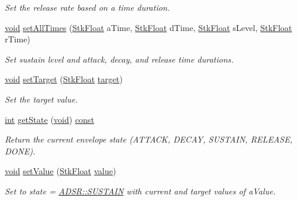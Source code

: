 \begin{DoxyCompactItemize}
\begin{DoxyCompactList}\small\item\em Set the release rate based on a time duration. \end{DoxyCompactList}\item 
\hyperlink{sound_8c_ae35f5844602719cf66324f4de2a658b3}{void} \hyperlink{class_nyq_1_1_a_d_s_r_a52e618060c63d77ff3a88fb04f271476}{set\+All\+Times} (\hyperlink{namespace_nyq_a044fa20a706520a617bbbf458a7db7e4}{Stk\+Float} a\+Time, \hyperlink{namespace_nyq_a044fa20a706520a617bbbf458a7db7e4}{Stk\+Float} d\+Time, \hyperlink{namespace_nyq_a044fa20a706520a617bbbf458a7db7e4}{Stk\+Float} s\+Level, \hyperlink{namespace_nyq_a044fa20a706520a617bbbf458a7db7e4}{Stk\+Float} r\+Time)
\begin{DoxyCompactList}\small\item\em Set sustain level and attack, decay, and release time durations. \end{DoxyCompactList}\item 
\hyperlink{sound_8c_ae35f5844602719cf66324f4de2a658b3}{void} \hyperlink{class_nyq_1_1_a_d_s_r_af287a70f7468ab5e3b3d99a80646c667}{set\+Target} (\hyperlink{namespace_nyq_a044fa20a706520a617bbbf458a7db7e4}{Stk\+Float} \hyperlink{lib_2expat_8h_a15a257516a87decb971420e718853137}{target})
\begin{DoxyCompactList}\small\item\em Set the target value. \end{DoxyCompactList}\item 
\hyperlink{xmltok_8h_a5a0d4a5641ce434f1d23533f2b2e6653}{int} \hyperlink{class_nyq_1_1_a_d_s_r_a886b69883840febfc562ff0fe74b7ee9}{get\+State} (\hyperlink{sound_8c_ae35f5844602719cf66324f4de2a658b3}{void}) \hyperlink{getopt1_8c_a2c212835823e3c54a8ab6d95c652660e}{const} 
\begin{DoxyCompactList}\small\item\em Return the current envelope {\itshape state} (A\+T\+T\+A\+CK, D\+E\+C\+AY, S\+U\+S\+T\+A\+IN, R\+E\+L\+E\+A\+SE, D\+O\+NE). \end{DoxyCompactList}\item 
\hyperlink{sound_8c_ae35f5844602719cf66324f4de2a658b3}{void} \hyperlink{class_nyq_1_1_a_d_s_r_a380f5614173678d20fe7b7cce82f1dd7}{set\+Value} (\hyperlink{namespace_nyq_a044fa20a706520a617bbbf458a7db7e4}{Stk\+Float} \hyperlink{lib_2expat_8h_a4a30a13b813682e68c5b689b45c65971}{value})
\begin{DoxyCompactList}\small\item\em Set to state = \hyperlink{class_nyq_1_1_a_d_s_r_ab800aaf78adb724e9df53dbbb3080fcca7c0212dc7f2d2360e6d4dd94ba83d129}{A\+D\+S\+R\+::\+S\+U\+S\+T\+A\+IN} with current and target values of {\itshape a\+Value}. \end{DoxyCompactList}\end{DoxyCompactItemize}
